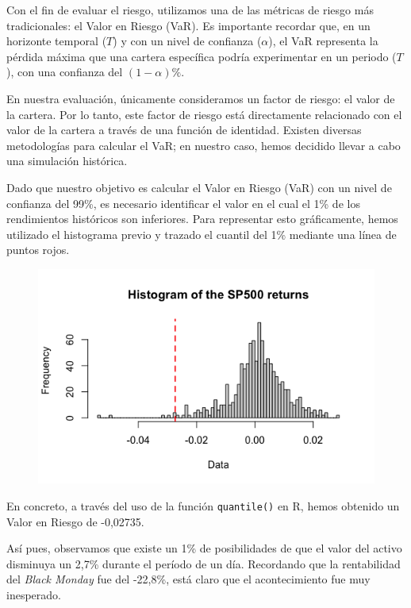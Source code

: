 \documentclass[a4paper]{article}
\begin{document}
Con el fin de evaluar el riesgo, utilizamos una de las métricas de riesgo más tradicionales: el Valor en Riesgo (VaR). Es importante recordar que, en un horizonte temporal ($T$) y con un nivel de confianza ($\alpha$), el VaR representa la pérdida máxima que una cartera específica podría experimentar en un periodo ($T$), con una confianza del $(1-\alpha)\%$.

En nuestra evaluación, únicamente consideramos un factor de riesgo: el valor de la cartera. Por lo tanto, este factor de riesgo está directamente relacionado con el valor de la cartera a través de una función de identidad. Existen diversas metodologías para calcular el VaR; en nuestro caso, hemos decidido llevar a cabo una simulación histórica.

Dado que nuestro objetivo es calcular el Valor en Riesgo (VaR) con un nivel de confianza del 99\%, es necesario identificar el valor en el cual el 1\% de los rendimientos históricos son inferiores. Para representar esto gráficamente, hemos utilizado el histograma previo y trazado el cuantil del 1\% mediante una línea de puntos rojos.
\begin{figure}
    \centering
    \includegraphics[width=0.6\linewidth]{plot3.png}  
\end{figure}

En concreto, a través del uso de la función \texttt{quantile()} en R, hemos obtenido un Valor en Riesgo de -0,02735.

Así pues, observamos que existe un 1\% de posibilidades de que el valor del activo disminuya un 2,7\% durante el período de un día. Recordando que la rentabilidad del \textit{Black Monday} fue del -22,8\%, está claro que el acontecimiento fue muy inesperado.
\end{document}
